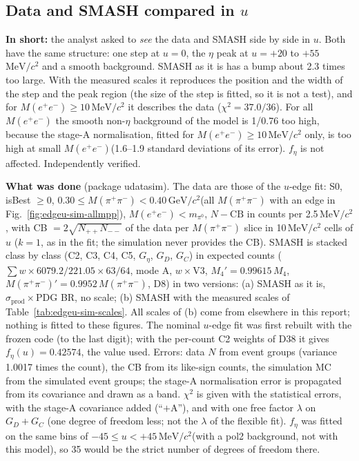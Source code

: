\documentclass[11pt,a4paper]{article}
\newcommand{\piz}{\ensuremath{\pi^{0}}\xspace}
\newcommand{\Mee}{\ensuremath{M(e^{+}e^{-})}\xspace}
\newcommand{\Mpipi}{\ensuremath{M(\pi^{+}\pi^{-})}\xspace}
\newcommand{\GeVcc}{\ensuremath{\mathrm{GeV}/c^{2}}\xspace}
\newcommand{\MeVcc}{\ensuremath{\mathrm{MeV}/c^{2}}\xspace}
\newcommand{\Geta}{\ensuremath{G_\eta}\xspace}
\newcommand{\tipbox}[1]{\par\noindent\colorbox{blue!6}{\parbox{\dimexpr\linewidth-2\fboxsep\relax}{#1}}\par}
\newcommand{\inshort}[1]{\tipbox{\textbf{In short:} #1}}%
\begin{document}
\subsection{Data and SMASH compared in \texorpdfstring{$u$}{u}}
\label{sec:edgeu-sim}
\inshort{the analyst asked to \emph{see} the data and SMASH side by side in $u$. Both have the same structure: one step at $u=0$, the $\eta$
peak at $u=+20$ to $+55$\,\MeVcc and a smooth background. SMASH as it is has a bump about 2.3 times too large. With the measured scales it
reproduces the position and the width of the step and the peak region (the size of the step is fitted, so it is not a test), and for
\Mee$\ge10$\,\MeVcc it describes the data ($\chi^2=37.0/36$). For all \Mee the smooth non-$\eta$ background of the model is 1/0.76 too high,
because the stage-A normalisation, fitted for \Mee$\ge10$\,\MeVcc only, is too high at small \Mee (1.6--1.9 standard deviations of its error).
$f_\eta$ is not affected. Independently verified.}

\textbf{What was done} (package udatasim). The data are those of the $u$-edge fit: S0, isBest $\ge0$, $0.30\le\Mpipi<0.40$\,\GeVcc (all \Mpipi
with an edge in Fig.~\ref{fig:edgeu-sim-allmpp}), \Mee$<m_{\piz}$, $N-\mathrm{CB}$ in counts per 2.5\,\MeVcc, with CB $=2\sqrt{N_{++}N_{--}}$ of
the data per \Mpipi slice in 10\,\MeVcc cells of $u$ ($k=1$, as in the fit; the simulation never provides the CB). SMASH is stacked class by
class (C2, C3, C4, C5, \Geta, $G_D$, $G_C$) in expected counts ($\sum w\times6079.2/221.05\times63/64$, mode A, $w\times$V3,
$M_4'=0.99615\,M_4$, $\Mpipi'=0.9952\,\Mpipi$, D8) in two versions: (a) SMASH as it is, $\sigma_{\mathrm{prod}}\times$PDG BR, no scale; (b)
SMASH with the measured scales of Table~\ref{tab:edgeu-sim-scales}. All scales of (b) come from elsewhere in this report; nothing is fitted to
these figures. The nominal $u$-edge fit was first rebuilt with the frozen code (to the last digit); with the per-count C2 weights of D38 it gives
$f_\eta(u)=0.42574$, the value used. Errors: data $N$ from event groups (variance 1.0017 times the count), the CB from its like-sign counts,
the simulation MC from the simulated event groups; the stage-A normalisation error is propagated from its covariance and drawn as a band.
$\chi^2$ is given with the statistical errors, with the stage-A covariance added (``$+$A''), and with one free factor $\lambda$ on $G_D+G_C$
(one degree of freedom less; not the $\lambda$ of the flexible fit). $f_\eta$ was fitted on the same bins of $-45\le u<+45$\,\MeVcc (with a pol2
background, not with this model), so 35 would be the strict number of degrees of freedom there.
\end{document}
